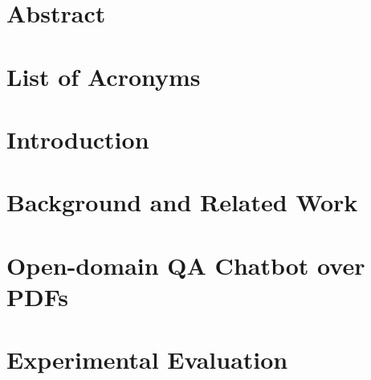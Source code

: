 \documentclass[
     12pt,         %
     a4paper,      %
     BCOR10mm,     %
     DIV14,        %
     ]{scrreprt}
\begin{document}
\chapter*{Abstract}

\newpage

\tableofcontents
\cleardoublepage
{} 

\chapter*{List of Acronyms}
\printglossary[type=\acronymtype]

\listoffigures
\listoftables



\chapter{Introduction}
\label{chap:intro}


\newpage

\chapter{Background and Related Work}
\label{chap:grundlagen}



\newpage

\chapter{Open-domain QA Chatbot over PDFs}
\label{chap:main}




\newpage

\chapter{Experimental Evaluation}
\label{chap:eval}
\end{document}
